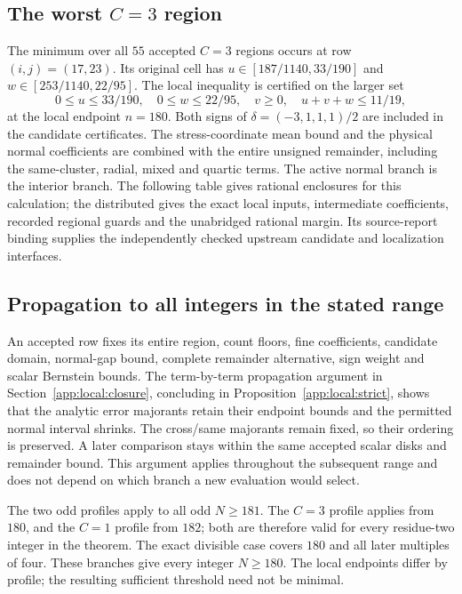 \subsection{The worst \texorpdfstring{$C=3$}{C=3} region}
\label{app:certificates:worst}
The minimum over all $55$ accepted $C=3$ regions occurs at row
$(i,j)=(17,23)$. Its original cell has
$u\in[187/1140,33/190]$ and $w\in[253/1140,22/95]$.
The local inequality is certified on the larger set
\begin{equation}\label{app:certificates:worst-domain}
 0\le u\le33/190,\quad 0\le w\le22/95,\quad
 v\ge0,\quad u+v+w\le11/19,
\end{equation}
at the local endpoint $n=180$. Both signs of
$\delta=(-3,1,1,1)/2$ are included in the candidate certificates.
The stress-coordinate mean bound and the physical normal coefficients are
combined with the entire unsigned remainder, including the same-cluster,
radial, mixed and quartic terms. The active normal branch is the interior
branch. The following table gives rational enclosures for this calculation;
the distributed
 gives the exact local inputs,
intermediate coefficients, recorded regional guards and the unabridged
rational margin. Its source-report binding supplies the independently
checked upstream candidate and localization interfaces.


\subsection{Propagation to all integers in the stated range}
An accepted row fixes its entire region, count floors, fine coefficients,
candidate domain, normal-gap bound, complete remainder alternative,
sign weight and scalar Bernstein bounds. The term-by-term propagation
argument in Section~\ref{app:local:closure}, concluding in
Proposition~\ref{app:local:strict}, shows that the analytic error
majorants retain their endpoint bounds and the permitted normal interval shrinks.
The cross/same majorants remain fixed, so their ordering is preserved.
A later comparison stays within the same accepted scalar disks and
remainder bound. This argument applies throughout the subsequent range
and does not depend on which branch a new evaluation would select.

The two odd profiles apply to all odd $N\ge181$. The $C=3$ profile
applies from $180$, and the $C=1$ profile from $182$; both are therefore
valid for every residue-two integer in the theorem. The exact
divisible case covers $180$ and all later multiples of four. These
branches give every integer $N\ge180$. The local endpoints differ by
profile; the resulting sufficient threshold need not be minimal.

